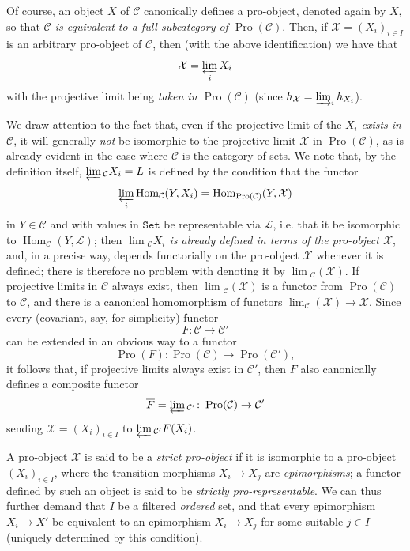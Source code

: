   Of course, an object \(X\) of \(\mathcal {C}\) canonically defines a pro-object, denoted again by \(X\), so that \emph{\(\mathcal {C}\) is equivalent to a full subcategory of \(\operatorname {Pro}(\mathcal {C})\)}.
  Then, if \(\mathcal {X}=(X_i)_{i\in  I}\) is an arbitrary pro-object of \(\mathcal {C}\), then (with the above identification) we have that
  \[     \mathcal {X}     = \varprojlim _i X_i   \]
  with the projective limit being \emph{taken in \(\operatorname {Pro}(\mathcal {C})\)} (since \(h_{\mathcal {X}}=\varinjlim _i h_{X_i}\)).\par{}We draw attention to the fact that, even if the projective limit of the \(X_i\) \emph{exists in \(\mathcal {C}\)}, it will generally \emph{not} be isomorphic to the projective limit \(\mathcal {X}\) in \(\operatorname {Pro}(\mathcal {C})\), as is already evident in the case where \(\mathcal {C}\) is the category of sets.
  We note that, by the definition itself, \(\varprojlim {}_{\mathcal {C}}X_i=L\) is defined by the condition that the functor
  \[     \varprojlim _i\operatorname {Hom}_{\mathcal {C}}(Y,X_i)     = \operatorname {Hom}_{\operatorname {Pro}(\mathcal {C})}(Y,\mathcal {X})   \]
  in \(Y\in \mathcal {C}\) and with values in \(\mathtt {Set}\) be representable via \(\mathcal {L}\), i.e. that it be isomorphic to \(\operatorname {Hom}_{\mathcal {C}}(Y,\mathcal {L})\);
  then \emph{\(\lim {}_{\mathcal {C}}X_i\) is already defined in terms of the \emph{pro-object} \(\mathcal {X}\)}, and, in a precise way, depends functorially on the pro-object \(\mathcal {X}\) whenever it is defined;
  there is therefore no problem with denoting it by \(\lim {}_{\mathcal {C}}(\mathcal {X})\).
  If projective limits in \(\mathcal {C}\) always exist, then \(\lim {}_{\mathcal {C}}(\mathcal {X})\) is a functor from \(\operatorname {Pro}(\mathcal {C})\) to \(\mathcal {C}\), and there is a canonical homomorphism of functors \(\lim _\mathcal {C}(\mathcal {X})\to \mathcal {X}\).
  Since every (covariant, say, for simplicity) functor
  \[     F\colon  \mathcal {C} \to  \mathcal {C}'   \]
  can be extended in an obvious way to a functor
  \[     \operatorname {Pro}(F)\colon  \operatorname {Pro}(\mathcal {C}) \to  \operatorname {Pro}(\mathcal {C}'),   \]
  it follows that, if projective limits always exist in \(\mathcal {C}'\), then \(F\) also canonically defines a composite functor
  \[     \overline {F}     = \varprojlim {}_{\mathcal {C}'}\colon  \operatorname {Pro}(\mathcal {C}) \to  \mathcal {C}'   \]
  sending \(\mathcal {X}=(X_i)_{i\in  I}\) to \(\varprojlim {}_{\mathcal {C}'}F(X_i)\).\par{}A pro-object \(\mathcal {X}\) is said to be a \emph{strict pro-object} if it is isomorphic to a pro-object \((X_i)_{i\in  I}\), where the transition morphisms \(X_i\to  X_j\) are \emph{epimorphisms};
  a functor defined by such an object is said to be \emph{strictly pro-representable}.
  We can thus further demand that \(I\) be a filtered \emph{ordered} set, and that every epimorphism \(X_i\to  X'\) be equivalent to an epimorphism \(X_i\to  X_j\) for some suitable \(j\in  I\) (uniquely determined by this condition).
  
